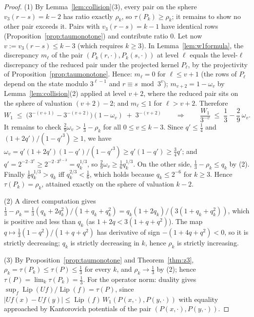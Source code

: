 \documentclass[11pt]{amsart}
\theoremstyle{definition}
\theoremstyle{remark}
\newcommand{\Lip}{\operatorname{Lip}}
\newcommand{\dW}{W_1}
\begin{document}
\begin{proof}
(1) By Lemma~\ref{lem:collision}(3), every pair on the sphere $v_3(r-s) = k-2$ has ratio exactly $\rho_k$, so $\tau(P_k) \ge \rho_k$; it remains to show no other pair exceeds it. Pairs with $v_3(r-s) = k-1$ have identical rows (Proposition~\ref{prop:taumonotone}) and contribute ratio $0$. Let now $v := v_3(r - s) \le k-3$ (which requires $k \ge 3$). In Lemma~\ref{lem:w1formula}, the discrepancy $m_\ell$ of the pair $(P_k(r,\cdot), P_k(s,\cdot))$ at level $\ell$ equals the level-$\ell$ discrepancy of the reduced pair under the projected kernel $P_\ell$, by the projectivity of Proposition~\ref{prop:taumonotone}. Hence: $m_\ell = 0$ for $\ell \le v + 1$ (the rows of $P_\ell$ depend on the state modulo $3^{\ell-1}$ and $r \equiv s \bmod 3^{v}$); $m_{v+2} = 1 - \omega_v$ by Lemma~\ref{lem:collision}(2) applied at level $v+2$, where the reduced pair sits on the sphere of valuation $(v+2)-2$; and $m_\ell \le 1$ for $\ell > v+2$. Therefore
\[
\dW \;\le\; \bigl(3^{-(v+1)} - 3^{-(v+2)}\bigr)(1 - \omega_v) \;+\; 3^{-(v+2)}
\qquad\Longrightarrow\qquad
\frac{\dW}{3^{-v}} \;\le\; \frac13 - \frac29\, \omega_v .
\]
It remains to check $\tfrac29 \omega_v > \tfrac13 - \rho_k$ for all $0 \le v \le k-3$. Since $q' \le \tfrac14$ and $(1+2q')/(1-q'^3) \ge 1$, we have $\omega_v = q'(1+2q')(1-q')/(1-q'^3) \ge q'(1 - q') \ge \tfrac34 q'$; and $q' = 2^{-2\cdot 3^v} \ge 2^{-2 \cdot 3^{k-3}} = q_k^{1/3}$, so $\tfrac29 \omega_v \ge \tfrac16 q_k^{1/3}$. On the other side, $\tfrac13 - \rho_k \le q_k$ by (2). Finally $\tfrac16 q_k^{1/3} > q_k$ iff $q_k^{2/3} < \tfrac16$, which holds because $q_k \le 2^{-6}$ for $k \ge 3$. Hence $\tau(P_k) = \rho_k$, attained exactly on the sphere of valuation $k-2$.

(2) A direct computation gives $\tfrac13 - \rho_k = \tfrac13 (q_k + 2q_k^2)/(1 + q_k + q_k^2) = q_k(1+2q_k)/(3(1+q_k+q_k^2))$, which is positive and less than $q_k$ (as $1 + 2q < 3(1+q+q^2)$). The map $q \mapsto \tfrac13(1-q^2)/(1+q+q^2)$ has derivative of sign $-(1 + 4q + q^2) < 0$, so it is strictly decreasing; $q_k$ is strictly decreasing in $k$, hence $\rho_k$ is strictly increasing.

(3) By Proposition~\ref{prop:taumonotone} and Theorem~\ref{thm:z3}, $\rho_k = \tau(P_k) \le \tau(P) \le \tfrac13$ for every $k$, and $\rho_k \to \tfrac13$ by (2); hence $\tau(P) = \lim_k \tau(P_k) = \tfrac13$. For the operator norm: duality gives $\sup_{f} \Lip(Uf)/\Lip(f) = \tau(P)$, since $|Uf(x) - Uf(y)| \le \Lip(f)\, \dW(P(x,\cdot),P(y,\cdot))$ with equality approached by Kantorovich potentials of the pair $(P(x,\cdot), P(y,\cdot))$.


\end{proof}
\end{document}
